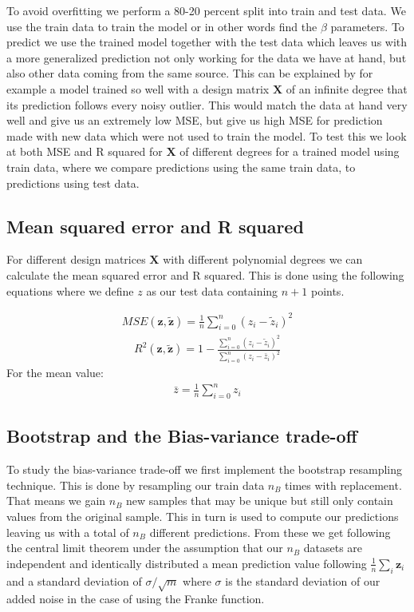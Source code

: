 \documentclass[12pt]{article}
\begin{document}
To avoid overfitting we perform a 80-20 percent split into train and test data. We use the train data to train the model or in other words find the $\beta$ parameters. To predict we use the trained model together with the test data which leaves us with a more generalized prediction not only working for the data we have at hand, but also other data coming from the same source. This can be explained by for example a model trained so well with a design matrix $\boldsymbol{X}$ of an infinite degree that its prediction follows every noisy outlier. This would match the data at hand very well and give us an extremely low MSE, but give us high MSE for prediction made with new data which were not used to train the model. To test this we look at both MSE and R squared for $\boldsymbol{X}$ of different degrees for a trained model using train data, where we compare predictions using the same train data, to predictions using test data.
\subsection{Mean squared error and R squared}
For different design matrices $\boldsymbol{X}$ with different polynomial degrees we can calculate the mean squared error and R squared. This is done using the following equations where we define $z$ as our test data containing $n+1$ points.

\begin{align*}
  MSE(\boldsymbol{z}, \boldsymbol{\tilde{z}}) = \frac{1}{n }\sum_{i=0}^{n}(z_i- \tilde{z}_i)^2
\end{align*}
\begin{align*}
  R^2(\boldsymbol{z}, \boldsymbol{\tilde{z}}) = 1 - \frac{\sum_{i=0}^{n}(z_i- \tilde{z}_i)^2}{\sum_{i=0}^{n}(z_i- \bar{z}_i)^2}
\end{align*}
For the mean value:
\begin{align*}
  \bar{z} = \frac{1}{n }\sum_{i=0}^{n}z_i
\end{align*}

\subsection{Bootstrap and the Bias-variance trade-off}
To study the bias-variance trade-off we first implement the bootstrap resampling technique. This is done by resampling our train data $n_B$ times with replacement. That means we gain $n_B$ new samples that may be unique but still only contain values from the original sample. This in turn is used to compute our predictions leaving us with a total of $n_B$ different predictions. From these we get following the central limit theorem under the assumption that our $n_B$ datasets are independent and identically distributed a mean prediction value following $\frac{1}{n}\sum_i \boldsymbol{z}_i$ and a standard deviation of $\sigma/\sqrt{m}$ where $\sigma$ is the standard deviation of our added noise in the case of using the Franke function.
\end{document}
